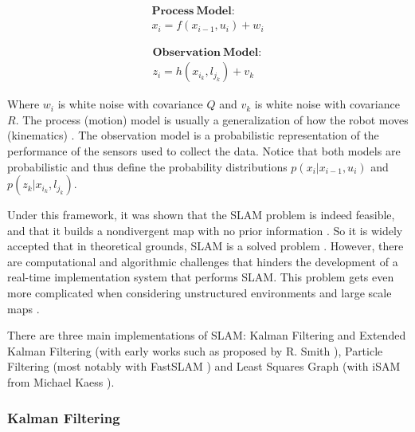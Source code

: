 \documentclass[11pt]{article}
\begin{document}
\noindent
\begin{minipage}{.48\linewidth}
\begin{equation*}
\begin{split}
\mathbf{Process\ Model:} \\ 
x_i = f(x_{i-1}, u_i) + w_i
\end{split}
\end{equation*}
\end{minipage}
\begin{minipage}{.48\linewidth}
\begin{equation*}
\begin{split}
\mathbf{Observation\ Model:} \\ 
z_i = h(x_{i_k}, l_{j_k}) + v_k
\end{split}
\end{equation*}
\end{minipage}
	
Where $w_i$ is white noise with covariance $Q$ and $v_k$ is white noise with covariance $R$. The process (motion) model is usually a generalization of how the robot moves (kinematics) \cite{Montemerlo02fastslam:a}\cite{772544}. The observation model is a probabilistic representation of the performance of the sensors used to collect the data. Notice that both models are probabilistic and thus define the probability distributions $p(x_i|x_{i-1},u_i)$ and $p(z_k|x_{i_k},l_{j_k})$.

Under this framework, it was shown that the SLAM problem is indeed feasible, and that it builds a nondivergent map with no prior information \cite{CsorbaThesis}. So it is widely accepted that in theoretical grounds, SLAM is a solved problem \cite{SLAMPartI}\cite{Cadena}\cite{CsorbaThesis}\cite{938381}. However, there are computational and algorithmic challenges that hinders the development of a real-time implementation system that performs SLAM. This problem gets even more complicated when considering unstructured environments and large scale maps \cite{SLAMPartII}.
	
There are three main implementations of SLAM: Kalman Filtering and Extended Kalman Filtering (with early works such as proposed by R. Smith \cite{Smith:1990:EUS:93002.93291}), Particle Filtering (most notably with FastSLAM \cite{Montemerlo02fastslam:a}) and Least Squares Graph (with iSAM from Michael Kaess \cite{Kaess08tro}).

	\subsubsection{Kalman Filtering}
\end{document}
